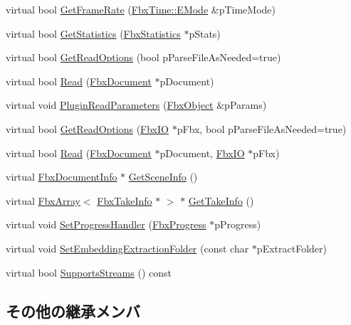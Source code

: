 \begin{DoxyCompactItemize}
virtual bool \hyperlink{class_fbx_reader_fbx7_a4aac7f6892348dd1f8fe5129cbfc2cc1}{Get\+Frame\+Rate} (\hyperlink{class_fbx_time_acc529b00a0e8d4c3da3702449ca93031}{Fbx\+Time\+::\+E\+Mode} \&p\+Time\+Mode)
\item 
virtual bool \hyperlink{class_fbx_reader_fbx7_a674cd0632a4d854d8a7dceb51179e8c9}{Get\+Statistics} (\hyperlink{class_fbx_statistics}{Fbx\+Statistics} $\ast$p\+Stats)
\item 
virtual bool \hyperlink{class_fbx_reader_fbx7_ac8d749c6a5f5c47573f27c26383401de}{Get\+Read\+Options} (bool p\+Parse\+File\+As\+Needed=true)
\item 
virtual bool \hyperlink{class_fbx_reader_fbx7_a037c53dbae903fd4aafbb942a563f759}{Read} (\hyperlink{class_fbx_document}{Fbx\+Document} $\ast$p\+Document)
\item 
virtual void \hyperlink{class_fbx_reader_fbx7_a60ceb6537da84cfd6540adde212b7b8f}{Plugin\+Read\+Parameters} (\hyperlink{class_fbx_object}{Fbx\+Object} \&p\+Params)
\item 
virtual bool \hyperlink{class_fbx_reader_fbx7_a18421554c40bb37447a5cc02ce4b9969}{Get\+Read\+Options} (\hyperlink{class_fbx_i_o}{Fbx\+IO} $\ast$p\+Fbx, bool p\+Parse\+File\+As\+Needed=true)
\item 
virtual bool \hyperlink{class_fbx_reader_fbx7_adc92ab67daddb05f8ebce961443b6dd3}{Read} (\hyperlink{class_fbx_document}{Fbx\+Document} $\ast$p\+Document, \hyperlink{class_fbx_i_o}{Fbx\+IO} $\ast$p\+Fbx)
\item 
virtual \hyperlink{class_fbx_document_info}{Fbx\+Document\+Info} $\ast$ \hyperlink{class_fbx_reader_fbx7_a9079add7d3edeb7af9378ae3a19fec35}{Get\+Scene\+Info} ()
\item 
virtual \hyperlink{class_fbx_array}{Fbx\+Array}$<$ \hyperlink{class_fbx_take_info}{Fbx\+Take\+Info} $\ast$ $>$ $\ast$ \hyperlink{class_fbx_reader_fbx7_a220f07e0cb0c171279e1f98e0433bbee}{Get\+Take\+Info} ()
\item 
virtual void \hyperlink{class_fbx_reader_fbx7_a513e9084df22767dfaf95252d815abbf}{Set\+Progress\+Handler} (\hyperlink{class_fbx_progress}{Fbx\+Progress} $\ast$p\+Progress)
\item 
virtual void \hyperlink{class_fbx_reader_fbx7_a411118263811ffa136e233abfb5a0d02}{Set\+Embedding\+Extraction\+Folder} (const char $\ast$p\+Extract\+Folder)
\item 
virtual bool \hyperlink{class_fbx_reader_fbx7_ab6283b540d9ea9141c9338400e1b8455}{Supports\+Streams} () const
\end{DoxyCompactItemize}
\subsection*{その他の継承メンバ}


